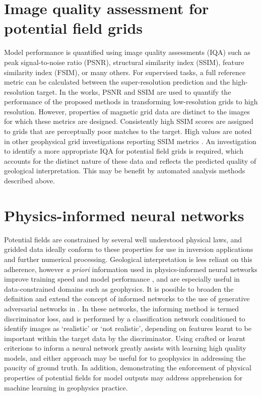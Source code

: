 \section{Image quality assessment for potential field grids}
Model performance is quantified using image quality assessments (IQA) such as peak signal-to-noise ratio (PSNR), structural similarity index (SSIM), feature similarity index (FSIM), or many others.
For supervised tasks, a full reference metric can be calculated between the super-resolution prediction and the high-resolution target.
In the  works, PSNR and SSIM are used to quantify the performance of the proposed methods in transforming low-resolution grids to high resolution.
However, properties of magnetic grid data are distinct to the images for which these metrics are designed.
Consistently high SSIM scores are assigned to grids that are perceptually poor matches to the target.
High values are noted in other geophysical grid investigations reporting SSIM metrics \parencite{wangDeeplearningbasedSeismicData2018,bavandsavadkoohiHighresolutionAeromagneticMap2023}.
An investigation to identify a more appropriate IQA for potential field grids is required, which accounts for the distinct nature of these data and reflects the predicted quality of geological interpretation.
This may be benefit by automated analysis methods described above.

\section{Physics-informed neural networks}
Potential fields are constrained by several well understood physical laws, and gridded data ideally conform to these properties for use in inversion applications and further numerical processing.
Geological interpretation is less reliant on this adherence, however \emph{a priori} information used in physics-informed neural networks improve training speed and model performance \parencite{raissiPhysicsinformedNeuralNetworks2019}, and are especially useful in data-constrained domains such as geophysics.
It is possible to broaden the definition and extend the concept of informed networks to the use of generative adversarial networks in .
In these networks, the informing method is termed discriminator loss, and is performed by a classification network conditioned to identify images as `realistic' or `not realistic', depending on features learnt to be important within the target data by the discriminator.
Using crafted or learnt criterions to inform a neural network greatly assists with learning high quality models, and either approach may be useful for to geophysics in addressing the paucity of ground truth.
In addition, demonstrating the enforcement of physical properties of potential fields for model outputs may address apprehension for machine learning in geophysics practice.

